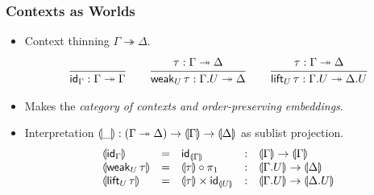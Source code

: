 \documentclass[t,fleqn,usenames,dvipsnames]{beamer}
\makeatletter
\renewcommand{\ru}[2]{\dfrac{\begin{array}[b]{@{}c@{}} #1 \end{array}}{\begin{array}[t]{@{}l@{}} #2 \end{array}}}
\newcommand{\cAnn}{\color{red!80!black}}%
\renewcommand{\emph}[1]{{\cAnn#1}}
\newcommand{\cType}{\color{orange!60!black}}
\renewcommand{\emph}[1]{\textit{\cType#1}}
\newcommand{\ope}{\twoheadrightarrow}
\makeatother
\begin{document}
\begin{frame}%
  \frametitle{Contexts as Worlds}
  \vspace{-3ex}
  \begin{itemize}
  \item Context thinning $\Gamma \ope \Delta$.
\[
  \ru{
    }{\tid_\Gamma : \Gamma \ope \Gamma}
\qquad
  \ru{\tau : \Gamma \ope \Delta
    }{\weak[U] \tau : \Gamma.U \ope \Delta}
\qquad
  \ru{\tau : \Gamma \ope \Delta
    }{\lift[U] \tau : \Gamma.U \ope \Delta.U}
\]
\vspace{-2ex}
  \item Makes the \emph{category of contexts and order-preserving embeddings}.

  \item Interpretation $\denty\_ : (\Gamma \ope \Delta) \to
    \denty\Gamma \to \denty\Delta$ as sublist projection.
\[
\begin{array}{lllll}
  \denty{\tid_\Gamma} & = & \tid_{\denty\Gamma}
    & : & \denty\Gamma \to \denty\Gamma \\
  \denty{\weak[U] \tau} & = & \denty\tau \comp \pi_1
    & : & \denty{\Gamma.U} \to \denty\Delta \\
  \denty{\lift[U] \tau} & = & \denty\tau \times \tid_{\denty U}
    & : & \denty{\Gamma.U} \to \denty{\Delta.U} \\
\end{array}
\]
  \end{itemize}
\end{frame}
\end{document}
